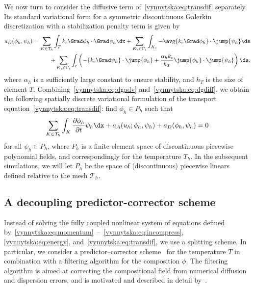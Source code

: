 We now turn to consider the diffusive term
of~\eqref{vynnytska:eq:transdif} separately. Its standard variational
form for a symmetric discontinuous Galerkin discretization with a
stabilization penalty term is given by~\citep{Arnold1982}
\begin{equation}
  \label{vynnytska:eq:dgdiff}
  \begin{split}
    a_D(\phi_h, \psi_h)
    =
    \sum_{K \in \mathcal{T}_h} \int_T k_c \Grad \phi_h \cdot \Grad \psi_h \dx
    + \sum_{K_e \in \Gamma_i }
    \int_{K_e} - \avg{k_c \Grad \phi_h} \cdot \jump{\psi_h} \ds \\
    + \sum_{K_e \in \Gamma_i} \int_{e} \left(
    - \{ k_c \Grad \psi_h\} \cdot \jump{\phi_h}
    + \frac{\alpha_h k_c}{h_T} \jump{\phi_h} \cdot \jump{\psi_h}
    \right) \ds,
  \end{split}
\end{equation}
where $\alpha_h$ is a sufficiently large constant to ensure stability,
and $h_T$ is the size of element
$T$. Combining~\eqref{vynnytska:eq:dgadv}
and~\eqref{vynnytska:eq:dgdiff}, we obtain the following spatially
discrete variational formulation of the transport
equation~\eqref{vynnytska:eq:transdif}: find $\phi_h \in P_h$ such
that
\begin{equation}
  \label{vynnytska:eq:semi_composition}
  \sum_{K \in \mathcal{T}_h} \int_K \frac{\partial \phi_h}{\partial t}\psi_h\dx
  + a_{A} (u_h; \phi_h, \psi_h) + a_D(\phi_h, \psi_h) = 0
\end{equation}
for all $\psi_h \in P_h$, where $P_h$ is a finite element space of
discontinuous piecewise polynomial fields, and correspondingly for the
temperature $T_h$. In the subsequent simulations, we will let $P_h$ be
the space of (discontinuous) piecewise linears defined relative to the
mesh $\mathcal{T}_h$.

\subsection{A decoupling predictor-corrector scheme}

Instead of solving the fully coupled nonlinear system of equations
defined
by~\eqref{vynnytska:eq:momentum}~--~\eqref{vynnytska:eq:incompress},
\eqref{vynnytska:eq:energy}, and~\eqref{vynnytska:eq:transdif}, we
use a splitting scheme. In particular, we consider a
predictor--corrector scheme~\citep{BergKekenYuen1993, HansenEbel1988}
for the temperature $T$ in combination with a filtering algorithm for
the composition $\phi$. The filtering algorithm is aimed at correcting
the compositional field from numerical diffusion and dispersion
errors, and is motivated and described in detail
by~\citet{LenardicKaula1993}.


